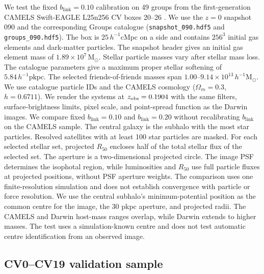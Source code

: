 \documentclass[usenatbib]{mnras}
\begin{document}
We test the fixed $b_{\mathrm{link}}=0.10$ calibration on 49 groups from the first-generation
CAMELS Swift-EAGLE L25n256 CV boxes 20--26 \citep{villaescusa2021}.
We use the $z=0$ snapshot 090 and the corresponding Groups catalogue
(\texttt{snapshot\_090.hdf5} and \texttt{groups\_090.hdf5}). The box is
$25\,h^{-1}\mathrm{cMpc}$ on a side and contains $256^3$ initial gas
elements and dark-matter particles. The snapshot header gives an initial gas
element mass of $1.89\times10^7\,\mathrm{M}_{\odot}$. Stellar particle masses
vary after stellar mass loss. The catalogue parameters give a maximum
proper stellar softening of $5.84\,h^{-1}\mathrm{pkpc}$. The selected
friends-of-friends masses span $1.00$--$9.14\times10^{13}\,h^{-1}\mathrm{M}_{\odot}$.
We use catalogue particle IDs and the CAMELS cosmology
($\Omega_m=0.3$, $h=0.6711$). We render the systems at
$z_{\rm obs}=0.1904$ with the same filters, surface-brightness limits,
pixel scale, and point-spread function as the Darwin images. We compare
fixed $b_{\mathrm{link}}=0.10$ and $b_{\mathrm{link}}=0.20$ without recalibrating $b_{\mathrm{link}}$ on the CAMELS sample.
The central galaxy is the subhalo with the most star particles. Resolved
satellites with at least 100 star particles are masked. For each selected
stellar set, projected $R_{50}$ encloses half of the total stellar flux
of the selected set. The aperture is a two-dimensional projected circle.
The image PSF determines the isophotal region, while luminosities and
$R_{50}$ use full particle fluxes at projected positions, without PSF
aperture weights. The comparison uses one finite-resolution simulation
and does not establish convergence with particle or force resolution. We use the central
subhalo's minimum-potential position as the common centre for the image,
the 30 pkpc aperture, and projected radii. The CAMELS and Darwin host-mass
ranges overlap, while Darwin extends to higher masses. The test uses a
simulation-known centre and does not test automatic centre identification
from an observed image.

\subsection{CV0--CV19 validation sample}
\label{sec:camels-validation}
\end{document}
